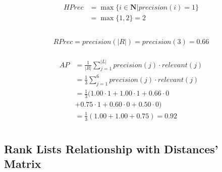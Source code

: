 \begin{example}
  \vspace{0.5cm}

  \begin{subexample}{\linewidth}
    \begin{gather*}
      \begin{split}
        HPrec &= \max\{i \in \mathbf{N} | precision(i) = 1\} \\
              &= \max\{1, 2\} = 2 \\
      \end{split}
    \end{gather*}
  \end{subexample}

  \vspace{0.5cm}

  \begin{subexample}{\linewidth}
    \begin{gather*}
      \begin{split}
        RPrec = precision(|R|) = precision(3) = 0.66
      \end{split}
    \end{gather*}
  \end{subexample}

  \vspace{0.5cm}

  \begin{subexample}{\linewidth}
    \begin{gather*}
      \begin{split}
        AP &= \frac{1}{|R|} \sum_{j=1}^{|L|} precision(j) \cdot relevant(j) \\
           &= \frac{1}{3} \sum_{j=1}^{6} precision(j) \cdot relevant(j) \\
           &= \frac{1}{3} ( 1.00 \cdot 1 + 1.00 \cdot 1 + 0.66 \cdot 0 \\
           &+ 0.75 \cdot 1 + 0.60 \cdot 0 + 0.50 \cdot 0) \\
           &= \frac{1}{3} (1.00 + 1.00 + 0.75) = 0.92 \\
      \end{split}
    \end{gather*}
  \end{subexample}

\end{example}

\subsection{Rank Lists Relationship with Distances' Matrix \label{sec:distances_matrix}}

